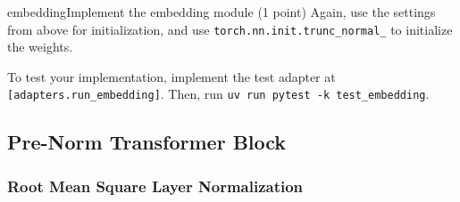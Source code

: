\begin{problembox}{embedding}{Implement the embedding module \hfill (1 point)}
    \vspace{0.5em}
    Again, use the settings from above for initialization, and use \texttt{torch.nn.init.trunc\_normal\_} to initialize the weights.

    To test your implementation, implement the test adapter at \textcolor{red!80!black}{\texttt{[adapters.run\_embedding]}}. Then, run \texttt{uv run pytest -k test\_embedding}.

\end{problembox}

\subsection{Pre-Norm Transformer Block}

\subsubsection{Root Mean Square Layer Normalization}

